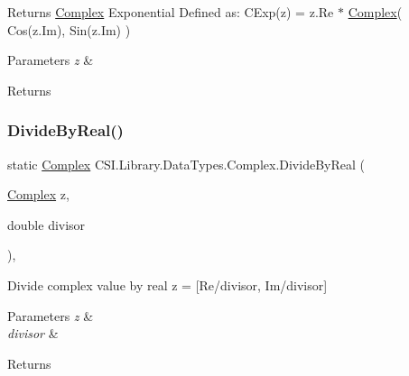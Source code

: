 Returns \mbox{\hyperlink{struct_c_s_i_1_1_library_1_1_data_types_1_1_complex}{Complex}} Exponential Defined as\+: C\+Exp(z) = z.\+Re $\ast$ \mbox{\hyperlink{struct_c_s_i_1_1_library_1_1_data_types_1_1_complex}{Complex}}( Cos(z.\+Im), Sin(z.\+Im) ) 


\begin{DoxyParams}{Parameters}
{\em z} & \\
\hline
\end{DoxyParams}
\begin{DoxyReturn}{Returns}

\end{DoxyReturn}
\mbox{\label{struct_c_s_i_1_1_library_1_1_data_types_1_1_complex_a9258fa8f1a0ae37481a3ff5e66e36e87}} 
\subsubsection{\texorpdfstring{DivideByReal()}{DivideByReal()}}
{\footnotesize\ttfamily static \mbox{\hyperlink{struct_c_s_i_1_1_library_1_1_data_types_1_1_complex}{Complex}} C\+S\+I.\+Library.\+Data\+Types.\+Complex.\+Divide\+By\+Real (\begin{DoxyParamCaption}\item[{\mbox{\hyperlink{struct_c_s_i_1_1_library_1_1_data_types_1_1_complex}{Complex}}}]{z,  }\item[{double}]{divisor }\end{DoxyParamCaption})\hspace{0.3cm}{\ttfamily [inline]}, {\ttfamily [static]}}



Divide complex value by real z = \mbox{[}Re/divisor, Im/divisor\mbox{]} 


\begin{DoxyParams}{Parameters}
{\em z} & \\
\hline
{\em divisor} & \\
\hline
\end{DoxyParams}
\begin{DoxyReturn}{Returns}

\end{DoxyReturn}
\mbox{\label{struct_c_s_i_1_1_library_1_1_data_types_1_1_complex_acdaf8fc1fd25ec76ad19b2f20204cfdb}} 
